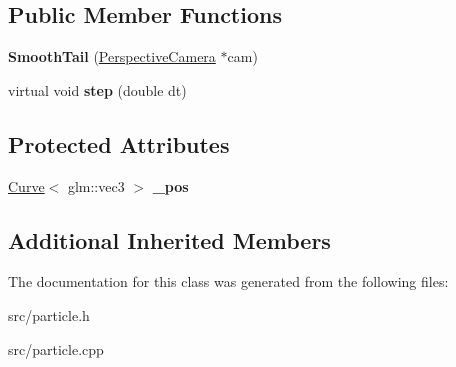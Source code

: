 \subsection*{Public Member Functions}
\begin{DoxyCompactItemize}
\item 
\hypertarget{class_smooth_tail_a7935e55aa8afe863510c94dd6f98c559}{}{\bfseries Smooth\+Tail} (\hyperlink{class_perspective_camera}{Perspective\+Camera} $\ast$cam)\label{class_smooth_tail_a7935e55aa8afe863510c94dd6f98c559}

\item 
\hypertarget{class_smooth_tail_adcc5e45aec048cde4de7495e7a04f6ad}{}virtual void {\bfseries step} (double dt)\label{class_smooth_tail_adcc5e45aec048cde4de7495e7a04f6ad}

\end{DoxyCompactItemize}
\subsection*{Protected Attributes}
\begin{DoxyCompactItemize}
\item 
\hypertarget{class_smooth_tail_ab694a9acc9da93cd7c13e0bd453314b5}{}\hyperlink{class_curve}{Curve}$<$ glm\+::vec3 $>$ {\bfseries \+\_\+pos}\label{class_smooth_tail_ab694a9acc9da93cd7c13e0bd453314b5}

\end{DoxyCompactItemize}
\subsection*{Additional Inherited Members}


The documentation for this class was generated from the following files\+:\begin{DoxyCompactItemize}
\item 
src/particle.\+h\item 
src/particle.\+cpp\end{DoxyCompactItemize}
